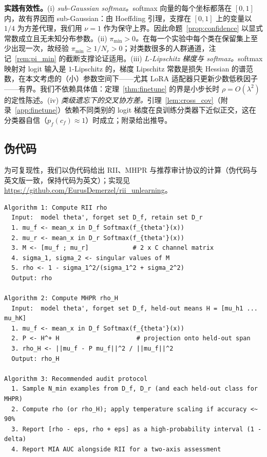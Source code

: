 \documentclass[11pt,a4paper]{article}
\begin{document}
\textbf{实践有效性。}(i) \emph{sub-Gaussian softmax。}softmax 向量的每个坐标都落在 $[0,1]$ 内，故有界因而 sub-Gaussian：由 Hoeffding 引理，支撑在 $[0,1]$ 上的变量以 $1/4$ 为方差代理，我们用 $\nu=1$ 作为保守上界。因此命题~\ref{prop:confidence} 以显式常数成立且无未知分布参数。(ii) \emph{$\pi_{\min}>0$。}在每一个实验中每个类在保留集上至少出现一次，故经验 $\pi_{\min}\ge 1/N_r>0$；对类数很多的人群通道，注记~\ref{rem:pi_min} 的截断支撑论证适用。(iii) \emph{$L$-Lipschitz 梯度与 softmax。}softmax 映射对 logit 输入是 $1$-Lipschitz 的，梯度 Lipschitz 常数是损失 Hessian 的谱范数，在本文考虑的（小）参数空间下——尤其 LoRA 适配器只更新少数低秩因子——有界。我们不依赖具体值：定理~\ref{thm:finetune} 的界是小步长时 $\rho=O(\lambda^2)$ 的定性陈述。(iv) \emph{类级遗忘下的交叉协方差。}引理~\ref{lem:cross_cov}（附录~\ref{app:finetune}）依赖不同类别的 logit 梯度在良训练分类器下近似正交，这在分类器自信（$p_f(c_f)\approx1$）时成立；附录给出推导。

\subsection{伪代码}
\label{sec:pseudocode}

为可复现性，我们以伪代码给出 RII、MHPR 与推荐审计协议的计算（伪代码与英文版一致，保持代码为英文）；实现见 \url{https://github.com/EurusDemerzel/rii_unlearning}。

{\small\begin{verbatim}
Algorithm 1: Compute RII rho
  Input:  model theta', forget set D_f, retain set D_r
  1. mu_f <- mean_x in D_f Softmax(f_{theta'}(x))
  2. mu_r <- mean_x in D_r Softmax(f_{theta'}(x))
  3. M <- [mu_f ; mu_r]            # 2 x C channel matrix
  4. sigma_1, sigma_2 <- singular values of M
  5. rho <- 1 - sigma_1^2/(sigma_1^2 + sigma_2^2)
  Output: rho

Algorithm 2: Compute MHPR rho_H
  Input:  model theta', forget set D_f, held-out means H = [mu_h1 ... mu_hK]
  1. mu_f <- mean_x in D_f Softmax(f_{theta'}(x))
  2. P <- H^+ H                     # projection onto held-out span
  3. rho_H <- ||mu_f - P mu_f||^2 / ||mu_f||^2
  Output: rho_H

Algorithm 3: Recommended audit protocol
  1. Sample N_min examples from D_f, D_r (and each held-out class for MHPR)
  2. Compute rho (or rho_H); apply temperature scaling if accuracy <~ 90%
  3. Report [rho - eps, rho + eps] as a high-probability interval (1 - delta)
  4. Report MIA AUC alongside RII for a two-axis assessment
\end{verbatim}}
\end{document}

